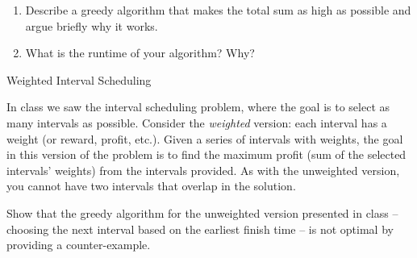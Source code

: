 \documentclass[10pt]{article}
\begin{document}
\begin{enumerate}

\item Describe a greedy algorithm that makes the total sum as high as possible and argue briefly why it works.

\solution{

}

\item What is the runtime of your algorithm?  Why?

\solution{

}

\end{enumerate}


\begin{problem} Weighted Interval Scheduling \end{problem}


In class we saw the interval scheduling problem, where the goal is to select as many intervals as possible.  Consider the {\em weighted} version: each interval has a weight (or reward, profit, etc.).  Given a series of intervals with weights, the goal in this version of the problem is to find the maximum profit (sum of the selected intervals' weights) from the intervals provided.  As with the unweighted version, you cannot have two intervals that overlap in the solution.


Show that the greedy algorithm for the unweighted version presented in class -- choosing the next interval based on the earliest finish time -- is not optimal by providing a counter-example.

\solution{

}
\end{document}
